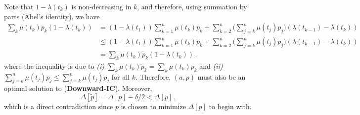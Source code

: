 \documentclass[12pt,letterpaper]{article}
\newenvironment{original}{\color{black}\noindent}{}
\theoremstyle{plain}
\theoremstyle{definition}
\theoremstyle{remark}
\renewcommand{\1}{\mathds{1}}
\theoremstyle{definition}
\begin{document}
\begin{original}
Note that $1 - \lambda(t_k)$ is non-decreasing in $k$, and therefore, using summation by parts (Abel's identity), we have
\begin{align*}
 \sum_k \mu(t_k) p_k (1 - \lambda(t_k)) &=   (1 - \lambda(t_1)) \sum_{k=1}^n \mu(t_k)p_k + \sum_{k=2}^n \Big(\sum_{j=k}^n  \mu(t_j) p_j\Big) ( \lambda(t_{k-1}) - \lambda(t_k)) \\
 &\leq (1 - \lambda(t_1)) \sum_{k=1}^n \mu(t_k) \tilde{p}_k + \sum_{k=2}^n \Big(\sum_{j=k}^n \mu(t_j) \tilde{p}_j  \Big) ( \lambda(t_{k-1}) - \lambda(t_k))\,
 \\
 &=  \sum_k \mu(t_k) \tilde{p}_k (1 - \lambda(t_k))\,.
\end{align*}
where the inequality is due to \textit{(i)} $\sum_k \mu(t_k) \tilde{p}_k = \sum_k \mu(t_k) p_k$ and \textit{(ii)} $\sum_{j=k}^n \mu(t_j) p_j \leq \sum_{j=k}^n \mu(t_j) \tilde{p}_j$ for all $k$. Therefore, $(a, \tilde{p})$ must also be an optimal solution to (\textbf{Downward-IC}). Moreover,
\[\Delta[\tilde{p}] = \Delta[p] - \delta/2 < \Delta[p]\,,\]
which is a direct contradiction since $p$ is chosen to minimize $\Delta[p]$ to begin with.
\end{original}
\end{document}
